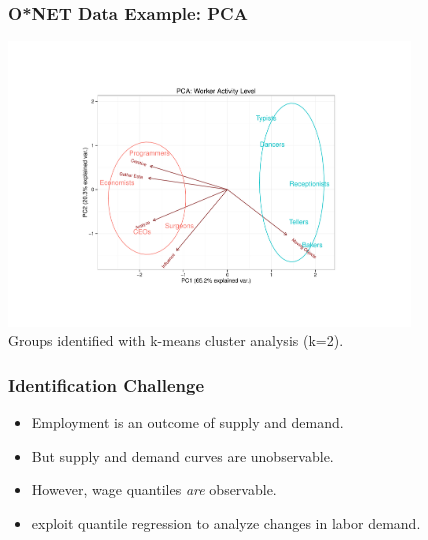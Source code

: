\documentclass[red]{beamer}
\begin{document}
\begin{frame}
  \frametitle{O*NET Data Example: PCA}
  \begin{center}
  \includegraphics[width=0.8\textwidth]{slides/pca_example.pdf} \\
  Groups identified with k-means cluster analysis (k=2).
  \end{center}
\end{frame}

\begin{frame}
  \frametitle{Identification Challenge}
  \begin{itemize}
  \item Employment is an outcome of supply and demand.
  \item But supply and demand curves are unobservable.
  \item However, wage quantiles {\em are} observable. 
  \item \citet{Firpo2011} exploit quantile regression to analyze changes in labor demand.
  \end{itemize}
\end{frame}
\end{document}
